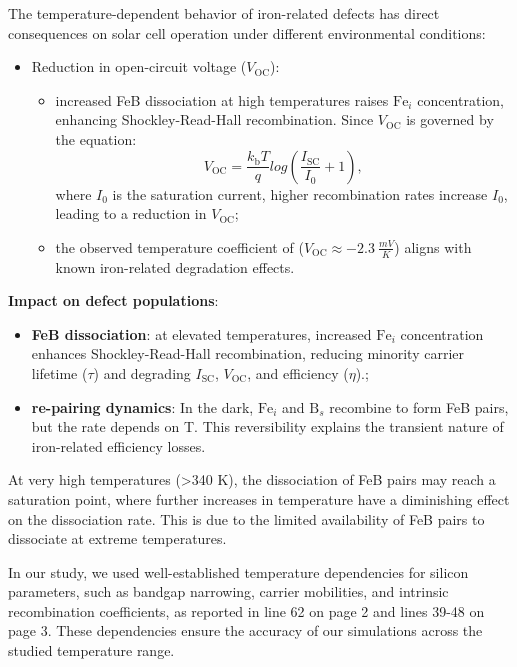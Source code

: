 \documentclass[a4paper,fleqn]{cas-sc}
\begin{document}
The temperature-dependent behavior of iron-related defects has direct consequences on solar cell operation under different environmental conditions:
\begin{itemize}
    \item Reduction in open-circuit voltage ($V_\mathrm{OC}$):
    \begin{itemize}
        \item increased FeB dissociation at high temperatures raises $\mathrm{Fe}_i$ concentration, enhancing Shockley-Read-Hall recombination. Since $V_\mathrm{OC}$ is governed by the equation:
        \begin{equation}
        \label{eq3}
             V_\mathrm{OC} = \frac{k_\mathrm{b}T}{q} log\left(\frac{I_\mathrm{SC}}{I_\mathrm{0}} + 1\right),
        \end{equation}
        where $I_\mathrm{0}$ is the saturation current, higher recombination rates increase $I_\mathrm{0}$, leading to a reduction in $V_\mathrm{OC}$;
        \item the observed temperature coefficient of ($V_\mathrm{OC} \approx -2.3~\frac{mV}{K}$) aligns with known iron-related degradation effects.
    \end{itemize}
\end{itemize}


\textbf{Impact on defect populations}:

\begin{itemize}
    \item \textbf{FeB dissociation}: at elevated temperatures, increased  $\mathrm{Fe}_i$ concentration enhances Shockley-Read-Hall recombination, reducing minority carrier lifetime ($\tau$) and degrading $I_\mathrm{SC}$, $V_\mathrm{OC}$, and efficiency ($\eta$).;
    \item \textbf{re-pairing dynamics}: In the dark, $\mathrm{Fe}_i$ and $\mathrm{B}_s$ recombine to form FeB pairs, but the rate depends on T. This reversibility explains the transient nature of iron-related efficiency losses.
\end{itemize}

At very high temperatures (>340 K), the dissociation of FeB pairs may reach a saturation point, where further increases in temperature have a diminishing effect on the dissociation rate. This is due to the limited availability of FeB pairs to dissociate at extreme temperatures.


In our study, we used well-established temperature dependencies for silicon parameters, such as bandgap narrowing, carrier mobilities, and intrinsic recombination coefficients, as reported in line 62 on page 2 and lines 39-48 on page 3. These dependencies ensure the accuracy of our simulations across the studied temperature range.
\end{document}
